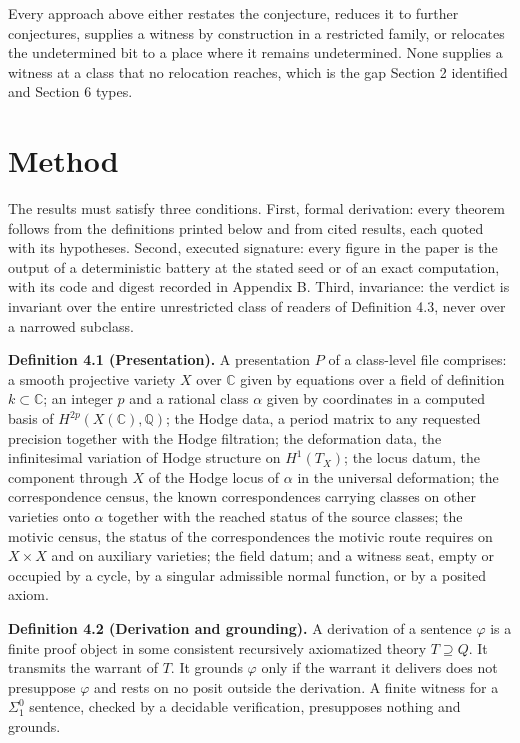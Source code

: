 \documentclass[10pt,twocolumn]{article}
\begin{document}
Every approach above either restates the conjecture, reduces it to
further conjectures, supplies a witness by construction in a restricted
family, or relocates the undetermined bit to a place where it remains
undetermined. None supplies a witness at a class that no relocation
reaches, which is the gap Section 2 identified and Section 6 types.

\hypertarget{method}{%
\section{Method}\label{method}}

The results must satisfy three conditions. First, formal derivation:
every theorem follows from the definitions printed below and from cited
results, each quoted with its hypotheses. Second, executed signature:
every figure in the paper is the output of a deterministic battery at
the stated seed or of an exact computation, with its code and digest
recorded in Appendix B. Third, invariance: the verdict is invariant over
the entire unrestricted class of readers of Definition 4.3, never over a
narrowed subclass.

\textbf{Definition 4.1 (Presentation).} A presentation \(P\) of a
class-level file comprises: a smooth projective variety \(X\) over
\(\mathbb{C}\) given by equations over a field of definition
\(k\subset\mathbb{C}\); an integer \(p\) and a rational class \(\alpha\)
given by coordinates in a computed basis of
\(H^{2p}(X(\mathbb{C}),\mathbb{Q})\); the Hodge data, a period matrix to
any requested precision together with the Hodge filtration; the
deformation data, the infinitesimal variation of Hodge structure on
\(H^1(T_X)\); the locus datum, the component through \(X\) of the Hodge
locus of \(\alpha\) in the universal deformation; the correspondence
census, the known correspondences carrying classes on other varieties
onto \(\alpha\) together with the reached status of the source classes;
the motivic census, the status of the correspondences the motivic route
requires on \(X\times X\) and on auxiliary varieties; the field datum;
and a witness seat, empty or occupied by a cycle, by a singular
admissible normal function, or by a posited axiom.

\textbf{Definition 4.2 (Derivation and grounding).} A derivation of a
sentence \(\varphi\) is a finite proof object in some consistent
recursively axiomatized theory \(T\supseteq Q\). It transmits the
warrant of \(T\). It grounds \(\varphi\) only if the warrant it delivers
does not presuppose \(\varphi\) and rests on no posit outside the
derivation. A finite witness for a \(\Sigma^0_1\) sentence, checked by a
decidable verification, presupposes nothing and grounds.
\end{document}
